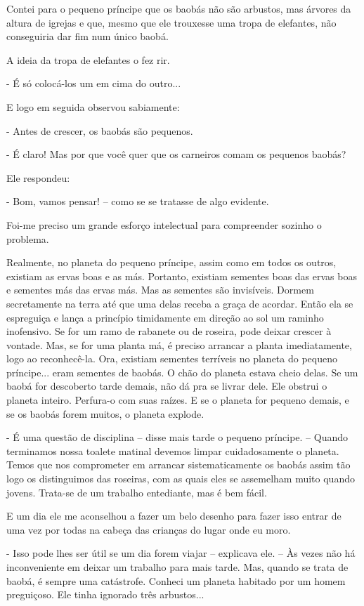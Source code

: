 \begin{Parallel}[p]{}{}
{Contei para o pequeno príncipe que os baobás não são arbustos, mas
árvores da altura de igrejas e que, mesmo que ele trouxesse uma tropa de
elefantes, não conseguiria dar fim num único baobá.

A ideia da tropa de elefantes o fez rir.

- É só colocá-los um em cima do outro...

E logo em seguida observou sabiamente:

- Antes de crescer, os baobás são pequenos.

- É claro! Mas por que você quer que os carneiros comam os pequenos
baobás?

Ele respondeu:

- Bom, vamos pensar! -- como se se tratasse de algo evidente.

Foi-me preciso um grande esforço intelectual para compreender sozinho o
problema.

Realmente, no planeta do pequeno príncipe, assim como em todos os
outros, existiam as ervas boas e as más. Portanto, existiam sementes
boas das ervas boas e sementes más das ervas más. Mas as sementes são
invisíveis. Dormem secretamente na terra até que uma delas receba a
graça de acordar. Então ela se espreguiça e lança a princípio
timidamente em direção ao sol um raminho inofensivo. Se for um ramo de
rabanete ou de roseira, pode deixar crescer à vontade. Mas, se for uma
planta má, é preciso arrancar a planta imediatamente, logo ao
reconhecê-la. Ora, existiam sementes terríveis no planeta do pequeno
príncipe... eram sementes de baobás. O chão do planeta estava cheio
delas. Se um baobá for descoberto tarde demais, não dá pra se livrar
dele. Ele obstrui o planeta inteiro. Perfura-o com suas raízes. E se o
planeta for pequeno demais, e se os baobás forem muitos, o planeta
explode.

- É uma questão de disciplina -- disse mais tarde o pequeno príncipe. --
Quando terminamos nossa toalete matinal devemos limpar cuidadosamente o
planeta. Temos que nos comprometer em arrancar sistematicamente os
baobás assim tão logo os distinguimos das roseiras, com as quais eles se
assemelham muito quando jovens. Trata-se de um trabalho entediante, mas
é bem fácil.

E um dia ele me aconselhou a fazer um belo desenho para fazer isso
entrar de uma vez por todas na cabeça das crianças do lugar onde eu
moro.

- Isso pode lhes ser útil se um dia forem viajar -- explicava ele. -- Às
vezes não há inconveniente em deixar um trabalho para mais tarde. Mas,
quando se trata de baobá, é sempre uma catástrofe. Conheci um planeta
habitado por um homem preguiçoso. Ele tinha ignorado três arbustos...

}
\end{Parallel}
